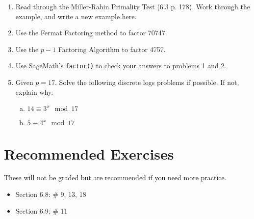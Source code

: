 \documentclass[12pt]{amsart}
\theoremstyle{plain}
\theoremstyle{definition}
\begin{document}
\begin{enumerate}[1.]
	\item Read through the Miller-Rabin Primality Test (6.3 p. 178).  Work through the example, and write a new example here.\\
		\begin{framed}
		\vspace{1.5in}
		\end{framed}
	\item Use the Fermat Factoring method to factor 70747.\\
		\begin{framed}
		\vspace{2in}
		\end{framed}
	\item Use the $p-1$ Factoring Algorithm to factor 4757.\\ 
		\begin{framed}
		\vspace{3in}
		\end{framed}
	\item Use SageMath's \texttt{factor()} to check your answers to problems 1 and 2.\\
		\begin{framed}
		\vspace{1in}
		\end{framed}
	\item Given $p = 17$.  Solve the following discrete logs problems if possible.  If not, explain why.
		\begin{enumerate}[a.]
			\item $14 \equiv 3^x \mod 17$
			\begin{framed}
			\vspace{2.5in}
			\end{framed}
			\newpage \item $5 \equiv 4^x \mod 17$
			\begin{framed}
			\vspace{2.5in}
			\end{framed}
		\end{enumerate}
\end{enumerate}


\section{Recommended Exercises}
\noindent These will not be graded but are recommended if you need more practice.
\begin{itemize}
	\item Section 6.8: \# 9, 13, 18
	\item Section 6.9: \# 11
\end{itemize}
	
\end{document}
